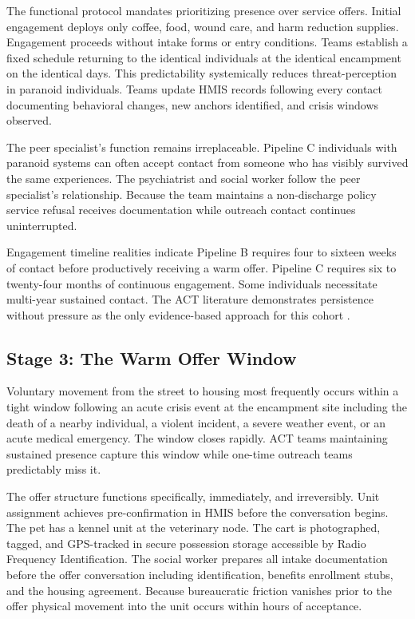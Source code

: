 \documentclass[12pt, letterpaper]{article}
\begin{document}
The functional protocol mandates prioritizing presence over service offers. Initial engagement deploys only coffee, food, wound care, and harm reduction supplies. Engagement proceeds without intake forms or entry conditions. Teams establish a fixed schedule returning to the identical individuals at the identical encampment on the identical days. This predictability systemically reduces threat-perception in paranoid individuals. Teams update HMIS records following every contact documenting behavioral changes, new anchors identified, and crisis windows observed.

The peer specialist's function remains irreplaceable. Pipeline C individuals with paranoid systems can often accept contact from someone who has visibly survived the same experiences. The psychiatrist and social worker follow the peer specialist's relationship. Because the team maintains a non-discharge policy service refusal receives documentation while outreach contact continues uninterrupted.

Engagement timeline realities indicate Pipeline B requires four to sixteen weeks of contact before productively receiving a warm offer. Pipeline C requires six to twenty-four months of continuous engagement. Some individuals necessitate multi-year sustained contact. The ACT literature demonstrates persistence without pressure as the only evidence-based approach for this cohort \citep{samhsa_act_2024}.

\subsection{Stage 3: The Warm Offer Window}

Voluntary movement from the street to housing most frequently occurs within a tight window following an acute crisis event at the encampment site including the death of a nearby individual, a violent incident, a severe weather event, or an acute medical emergency. The window closes rapidly. ACT teams maintaining sustained presence capture this window while one-time outreach teams predictably miss it.

The offer structure functions specifically, immediately, and irreversibly. Unit assignment achieves pre-confirmation in HMIS before the conversation begins. The pet has a kennel unit at the veterinary node. The cart is photographed, tagged, and GPS-tracked in secure possession storage accessible by Radio Frequency Identification. The social worker prepares all intake documentation before the offer conversation including identification, benefits enrollment stubs, and the housing agreement. Because bureaucratic friction vanishes prior to the offer physical movement into the unit occurs within hours of acceptance.
\end{document}
